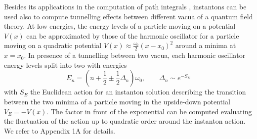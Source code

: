 Besides its applications in the computation of path integrals , instantons can be
used also to compute tunnelling effects between different vacua of a quantum field
theory. At low energies, the energy levels of a particle moving on a potential $V(x)$
can be approximated by those of the harmonic oscillator for a particle moving on
a quadratic potential $V(x)\approx \frac{\omega_0}{2}(x-x_0)^2$ around a minima at $x=x_0$. In presence of a tunnelling between two vacua, each harmonic oscillator energy levels split into two with energies
\begin{equation}
  E_n=\left(n+\frac{1}{2}\pm\frac{1}{2}\Delta_n\right)\omega_0,\qquad \Delta_n\sim e^{-S_E}
\end{equation}
with $S_E$ the Euclidean action for an instanton solution describing the transition between the two minima of a particle moving in the upside-down potential $V_E = -V(x)$. The factor in front of the exponential can be computed evaluating the fluctuation of the action up to quadratic order around the instanton action. We refer to Appendix 1A for details.















































